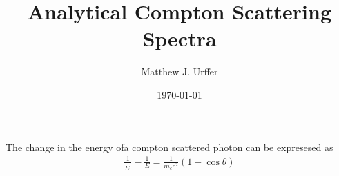 \documentclass[draftcls,onecolumn]{IEEEtran}
\begin{document}
\title{Analytical Compton Scattering Spectra}
\author{Matthew J. Urffer}
\date{\today}
\maketitle

\printnomenclature

\listoftodos
\tableofcontents
\listoffigures
\listoftables
\lstlistoflistings

The change in the energy ofa compton scattered photon can be expresesed as
\begin{align}
  \frac{1}{E^'} -\frac{1}{E} = \frac{1}{m_e c^2}\left(1-\cos\theta\right) 
\end{align}

\begin{itemize}

\end{itemize}
\end{document}
